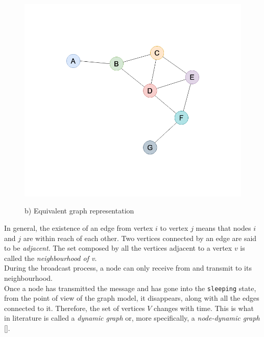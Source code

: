 \begin{figure}[H]
\begin{minipage}{.5\textwidth}
		\includegraphics[scale=.23]{img/wireless_graph_2.png}
		\begin{center}
            b) Equivalent graph representation
        \end{center}
	\end{minipage}
	\caption{}
    \label{fig:graph1}
\end{figure}
\noindent
In general, the existence of an edge from vertex $i$ to vertex $j$ means that
nodes $i$ and $j$ are within reach of each other. Two vertices connected by an
edge are said to be \textit{adjacent}. The set composed by all the vertices adjacent to a vertex $v$ is called the
\textit{neighbourhood of v}.\\
During the broadcast process, a node can only receive
from and transmit to its neighbourhood.\\
Once a node has transmitted the message and has gone into the \texttt{sleeping}
state, from the point of view of the graph model, it disappears, along with all
the edges connected to it. Therefore, the set of vertices $V$ changes with time.
This is what in literature is called a \textit{dynamic graph} or, more
specifically, a \textit{node-dynamic graph} [\cite{hararygraph}].\\

